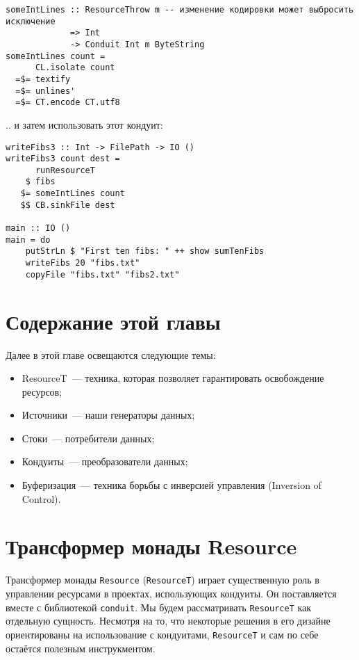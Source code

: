 \begin{lstlisting}
someIntLines :: ResourceThrow m -- изменение кодировки может выбросить исключение
             => Int
             -> Conduit Int m ByteString
someIntLines count =
      CL.isolate count
  =$= textify
  =$= unlines'
  =$= CT.encode CT.utf8
\end{lstlisting}
.. и затем использовать этот кондуит:
\begin{lstlisting}
writeFibs3 :: Int -> FilePath -> IO ()
writeFibs3 count dest =
      runResourceT
    $ fibs
   $= someIntLines count
   $$ CB.sinkFile dest

main :: IO ()
main = do
    putStrLn $ "First ten fibs: " ++ show sumTenFibs
    writeFibs 20 "fibs.txt"
    copyFile "fibs.txt" "fibs2.txt"
\end{lstlisting}

\section{Содержание этой главы}

Далее в этой главе освещаются следующие темы:
\begin{itemize}
 \item ResourceT~--- техника, которая позволяет гарантировать освобождение ресурсов;
 \item Источники~--- наши генераторы данных;
 \item Стоки~--- потребители данных;
 \item Кондуиты~--- преобразователи данных;
 \item Буферизация~--- техника борьбы с инверсией управления (Inversion of Control).
\end{itemize}

\section{Трансформер монады Resource}

Трансформер монады \verb*|Resource| (\verb*|ResourceT|) играет существенную роль в управлении ресурсами в
проектах, использующих кондуиты. Он поставляется вместе с библиотекой \verb=conduit=. 
Мы будем рассматривать \verb*|ResourceT| как отдельную сущность. Несмотря на то, что некоторые решения в его дизайне ориентированы на использование с кондуитами, \verb*|ResourceT| и сам по себе остаётся полезным инструкментом.

